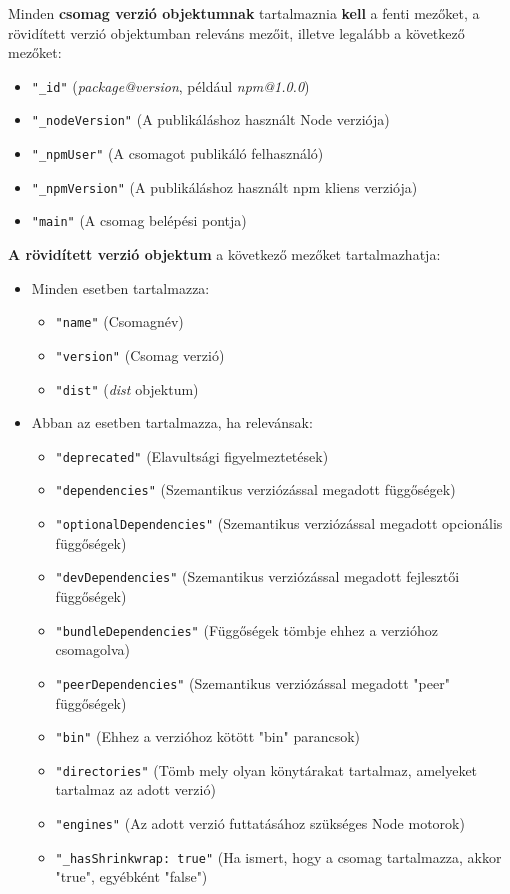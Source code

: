 Minden \textbf{csomag verzió objektumnak} tartalmaznia \textbf{kell} a fenti mezőket, a rövidített verzió objektumban releváns mezőit, illetve legalább a következő mezőket:
 
\begin{itemize}
	\item \texttt{"\_id"} (\emph{package@version}, például \emph{npm@1.0.0})
	\item \texttt{"\_nodeVersion"} (A publikáláshoz használt Node verziója)  
	\item \texttt{"\_npmUser"} (A csomagot publikáló felhasználó)
	\item \texttt{"\_npmVersion"} (A publikáláshoz használt npm kliens verziója)
	\item \texttt{"main"} (A csomag belépési pontja)
\end{itemize}

\textbf{A rövidített verzió objektum} a következő mezőket tartalmazhatja:

\begin{itemize}
	\item Minden esetben tartalmazza:
	\begin{itemize}
		\item \texttt{"name"} (Csomagnév)
		\item \texttt{"version"} (Csomag verzió)
		\item \texttt{"dist"} (\emph{dist} objektum)
	\end{itemize}
	\item Abban az esetben tartalmazza, ha relevánsak:
	\begin{itemize}
		\item \texttt{"deprecated"} (Elavultsági figyelmeztetések)
		\item \texttt{"dependencies"} (Szemantikus verziózással megadott függőségek)
		\item \texttt{"optionalDependencies"} (Szemantikus verziózással megadott opcionális függőségek)
		\item \texttt{"devDependencies"} (Szemantikus verziózással megadott fejlesztői függőségek)
		\item \texttt{"bundleDependencies"} (Függőségek tömbje ehhez a verzióhoz csomagolva)
		\item \texttt{"peerDependencies"} (Szemantikus verziózással megadott "peer" függőségek)
		\item \texttt{"bin"} (Ehhez a verzióhoz kötött "bin" parancsok)
		\item \texttt{"directories"} (Tömb mely olyan könytárakat tartalmaz, amelyeket tartalmaz az adott verzió)
		\item \texttt{"engines"} (Az adott verzió futtatásához szükséges Node motorok)
		\item \texttt{"\_hasShrinkwrap: true"} (Ha ismert, hogy a csomag tartalmazza, akkor "true", egyébként "false")
	\end{itemize}
\end{itemize}

